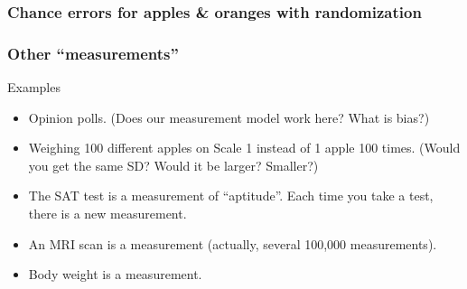 \documentclass[handout]{beamer}
\begin{document}
   \begin{frame}
   \frametitle{Chance errors for apples \& oranges with randomization}
   \begin{center}
   \end{center}

   \end{frame}


   \begin{frame} \frametitle{Other ``measurements''}

   \begin{block}
   {Examples}
   \begin{itemize}
   \item Opinion polls. (Does our measurement model work here? What is bias?)

   \item Weighing 100 different apples on Scale 1 instead of 1 apple
   100 times. (Would you get the same SD? Would it be larger? Smaller?)

   \item The SAT test is a measurement of ``aptitude''. Each time
   you take a test, there is a new measurement.

   \item An MRI scan is a measurement (actually, several 100,000 measurements).

   \item Body weight is a measurement.
   \end{itemize}
   \end{block}
   \end{frame}


   \begin{frame} 

   \end{frame}

   
\end{document}
